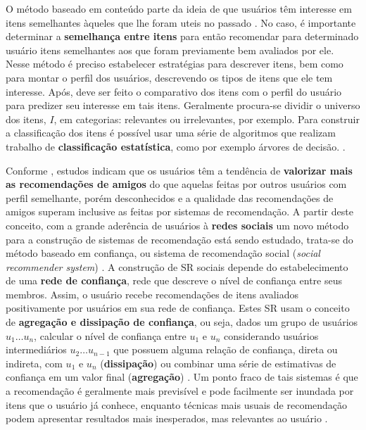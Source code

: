 \documentclass[12pt]{article}
\begin{document}
O método baseado em conteúdo parte da ideia de que usuários têm interesse em itens semelhantes àqueles que lhe foram uteis no passado \cite{ricci2011introduction}. No caso, é importante determinar a \textbf{semelhança entre itens} para então recomendar para determinado usuário itens semelhantes aos que foram previamente bem avaliados por ele. Nesse método é preciso estabelecer estratégias para descrever itens, bem como para montar o perfil dos usuários, descrevendo os tipos de itens que ele tem interesse. Após, deve ser feito o comparativo dos itens com o perfil do usuário para predizer seu interesse em tais itens. Geralmente procura-se dividir o universo dos itens, $I$, em categorias: relevantes ou irrelevantes, por exemplo. Para construir a classificação dos itens é possível usar uma série de algoritmos que realizam trabalho de \textbf{classificação estatística}, como por exemplo árvores de decisão.  \cite{pazzani2007content}.

Conforme \cite{sinha2001comparing}, estudos indicam que os usuários têm a tendência de \textbf{valorizar mais as recomendações de amigos} do que aquelas feitas por outros usuários com perfil semelhante, porém desconhecidos e a qualidade das recomendações de amigos superam inclusive as feitas por sistemas de recomendação. A partir deste conceito, com a grande aderência de usuários à \textbf{redes sociais} um novo método para a construção de sistemas de recomendação está sendo estudado, trata-se do método baseado em confiança, ou sistema de recomendação social (\textit{social recommender system}) \cite{ricci2011introduction}. A construção de SR sociais depende do estabelecimento de uma \textbf{rede de confiança}, rede que descreve o nível de confiança entre seus membros. Assim, o usuário recebe recomendações de itens avaliados positivamente por usuários em sua rede de confiança. Estes SR usam o conceito de \textbf{agregação e dissipação de confiança}, ou seja, dados um grupo de usuários $u_1  \dots u_n$, calcular o nível de confiança entre $u_1$ e $u_n$ considerando usuários intermediários $u_2 \dots u_{n-1}$ que possuem alguma relação de confiança, direta ou indireta, com $u_1$ e $u_n$ (\textbf{dissipação}) ou combinar uma série de estimativas de confiança em um valor final (\textbf{agregação}) \cite{victor2011trust}. Um ponto fraco de tais sistemas é que a recomendação é geralmente mais previsível e pode facilmente ser inundada por itens que o usuário já conhece, enquanto técnicas mais usuais de recomendação podem apresentar resultados mais inesperados, mas relevantes ao usuário \cite{sinha2001comparing}.
\end{document}
